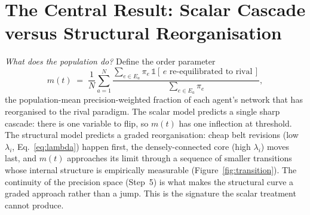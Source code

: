 \section{The Central Result: Scalar Cascade versus Structural Reorganisation}
\label{sec:result}

\noindent\textit{What does the population do?} Define the order parameter
\begin{equation}
m(t) \;=\; \frac{1}{N}\sum_{a=1}^{N}
   \frac{\sum_{e \in E_a} \pi_e\,\mathbb{1}[\,e \text{ re-equilibrated to rival}\,]}
        {\sum_{e \in E_a} \pi_e},
\label{eq:order}
\end{equation}
the population-mean precision-weighted fraction of each agent's network
that has reorganised to the rival paradigm. The scalar model predicts a
single sharp cascade: there is one variable to flip, so $m(t)$ has one
inflection at threshold. The structural model predicts a graded
reorganisation: cheap belt revisions (low $\lambda_i$,
Eq.~\ref{eq:lambda}) happen first, the densely-connected core (high
$\lambda_i$) moves last, and $m(t)$ approaches its limit through a
sequence of smaller transitions whose internal structure is empirically
measurable (Figure~\ref{fig:transition}). The continuity of the precision
space (Step~5) is what makes the structural curve a graded approach
rather than a jump. This is the signature the scalar treatment cannot
produce.

